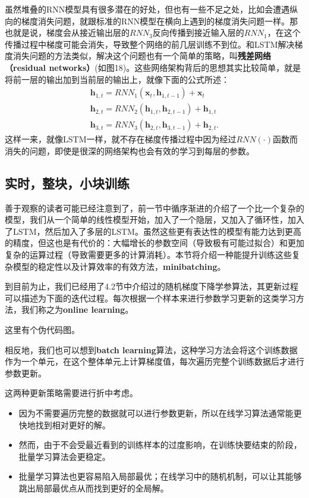 \documentclass[10pt,a4paper]{ctexart}
\begin{document}
虽然堆叠的RNN模型具有很多潜在的好处，但也有一些不足之处，比如会遭遇纵向的梯度消失问题，就跟标准的RNN模型在横向上遇到的梯度消失问题一样。那也就是说，梯度会从接近输出层的$RNN_3$反向传播到接近输入层的$RNN_1$，在这个传播过程中梯度可能会消失，导致整个网络的前几层训练不到位。和LSTM解决梯度消失问题的方法类似，解决这个问题也有一个简单的策略，叫\textbf{残差网络（residual networks）}(如图18)。这些网络架构背后的思想其实比较简单，就是将前一层的输出加到当前层的输出上，就像下面的公式所述：
\[
 \begin{array}{l}
 \textbf{h}_{1,t} = RNN_1 (\textbf{x}_t,\textbf{h}_{1,t-1}) + \textbf{x}_t \\
 \textbf{h}_{2,t} = RNN_2 (\textbf{h}_{1,t},\textbf{h}_{2,t-1}) + \textbf{h}_{1,t} \\
 \textbf{h}_{3,t} = RNN_3 (\textbf{h}_{2,t},\textbf{h}_{3,t-1}) + \textbf{h}_{2,t}.
 \end{array}
\]
这样一来，就像LSTM一样，就不存在梯度传播过程中因为经过$RNN(\cdot)$函数而消失的问题，即使是很深的网络架构也会有效的学习到每层的参数。

\subsection{实时，整块，小块训练}
善于观察的读者可能已经注意到了，前一节中循序渐进的介绍了一个比一个复杂的模型，我们从一个简单的线性模型开始，加入了一个隐层，又加入了循环性，加入了LSTM，然后加入了多层的LSTM。虽然这些更有表达性的模型有能力达到更高的精度，但这也是有代价的：大幅增长的参数空间（导致极有可能过拟合）和更加复杂的运算过程（导致需要更多的计算消耗）。本节将介绍一种能提升训练这些复杂模型的稳定性以及计算效率的有效方法，\textbf{minibatching}。

到目前为止，我们已经用了4.2节中介绍过的随机梯度下降学参算法，其更新过程可以描述为下面的迭代过程。每次根据一个样本来进行参数学习更新的这类学习方法，我们称之为\textbf{online learning}。

这里有个伪代码图。

相反地，我们也可以想到\textbf{batch learning}算法，这种学习方法会将这个训练数据作为一个单元，在这个整体单元上计算梯度值，每次遍历完整个训练数据后才进行参数更新。

这两种更新策略需要进行折中考虑。
\begin{itemize}
\item 因为不需要遍历完整的数据就可以进行参数更新，所以在线学习算法通常能更快地找到相对更好的解。
\item 然而，由于不会受最近看到的训练样本的过度影响，在训练快要结束的阶段，批量学习算法会更稳定。
\item 批量学习算法也更容易陷入局部最优；在线学习中的随机机制，可以让其能够跳出局部最优点从而找到更好的全局解。
\end{itemize}
\end{document}
